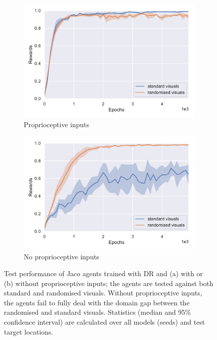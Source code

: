 \begin{figure}
  \centering
  \hspace{0.025\textwidth}
  \begin{subfigure}{0.45\textwidth}
    \includegraphics[width=\textwidth]{figures/chapter6/training_curves/jaco_prop.pdf}
    \caption{Proprioceptive inputs}
  \end{subfigure}
  \hfill
  \begin{subfigure}{0.45\textwidth}
    \includegraphics[width=\textwidth]{figures/chapter6/training_curves/jaco_noprop.pdf}
    \caption{No proprioceptive inputs}
  \end{subfigure}
  \hspace{0.025\textwidth}
  \caption{Test performance of Jaco agents trained with DR and (a) with or (b) without proprioceptive inputs; the agents are tested against both standard and randomised visuals. Without proprioceptive inputs, the agents fail to fully deal with the domain gap between the randomised and standard visuals. Statistics (median and 95\% confidence interval) are calculated over all models (seeds) and test target locations.}
  \label{fig:domain_shift}
\end{figure}

